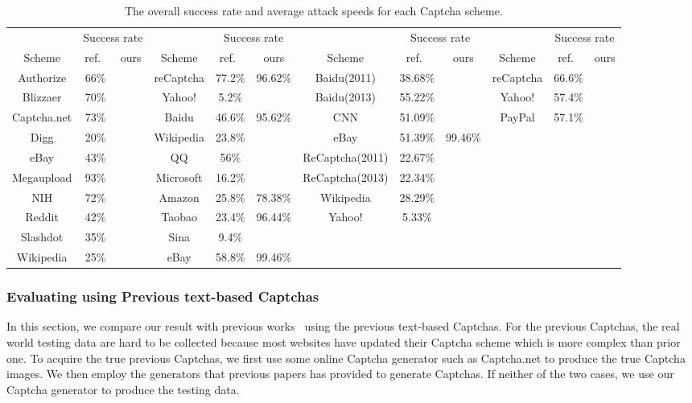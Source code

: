 \begin{table}[t]
    \centering
    \caption{The overall success rate and average attack speeds for each Captcha scheme.}
    \label{table: overall_rate}
    \small
    \begin{tabular}{|c|c|c|c|c|c|c|c|c|c|c|c|}
        \hline
        & \multicolumn{2}{|c|}{Success rate}& & \multicolumn{2}{|c|}{Success rate} & &\multicolumn{2}{|c|}{Success rate} & & \multicolumn{2}{|c|}{Success rate}\\
        \cline{2-3} \cline{5-6} \cline{8-9} \cline{11-12}
        \multirow{-2}{*}{Scheme} & ref.~\cite{Bursztein2011Text} & ours & \multirow{-2}{*}{Scheme} & ref.~\cite{Gao2016A} & ours & \multirow{-2}{*}{Scheme} & ref.~\cite{Bursztein2014The} & ours & \multirow{-2}{*}{Scheme} & ref.~\cite{George2017A} & ours \\
        \hline
        Authorize & 66\% & & reCaptcha & 77.2\% & 96.62\% & Baidu(2011) & 38.68\% & & reCaptcha & 66.6\% & \\
        \hline
        Blizzaer & 70\% & & Yahoo! & 5.2\% & & Baidu(2013) & 55.22\% & & Yahoo! & 57.4\% & \\
        \hline
        Captcha.net & 73\% & & Baidu & 46.6\% & 95.62\% & CNN & 51.09\% & & PayPal & 57.1\% & \\
        \hline
        Digg & 20\% & & Wikipedia & 23.8\% & & eBay & 51.39\% & 99.46\% & & &  \\
        \hline
        eBay & 43\% & & QQ & 56\% & & ReCaptcha(2011) & 22.67\% & & & &\\
        \hline
        Megaupload & 93\% & & Microsoft & 16.2\% & & ReCaptcha(2013) & 22.34\% & & & & \\
        \hline
        NIH & 72\% & & Amazon & 25.8\% & 78.38\% & Wikipedia & 28.29\% & & & & \\
        \hline
        Reddit & 42\% & & Taobao & 23.4\% & 96.44\% & Yahoo! & 5.33\% & & & &  \\
        \hline
        Slashdot & 35\% & & Sina & 9.4\% & & & & & & & \\
        \hline
        Wikipedia & 25\% & & eBay & 58.8\% & 99.46\% & & & & & & \\
        \hline
    \end{tabular}
\end{table}

\subsubsection{Evaluating using Previous text-based Captchas}
In this section, we compare our result with previous works~\cite{Bursztein2011Text,Gao2016A} using the previous text-based Captchas.
For the previous Captchas, the real world testing data are hard to be collected because most websites have updated their Captcha scheme which is more complex than prior one. To acquire the true previous Captchas, we first use some online Captcha generator such as Captcha.net to produce the true Captcha images. We then employ the generators that previous papers has provided to generate Captchas. If neither of the two cases, we use our Captcha generator to produce the testing data.

